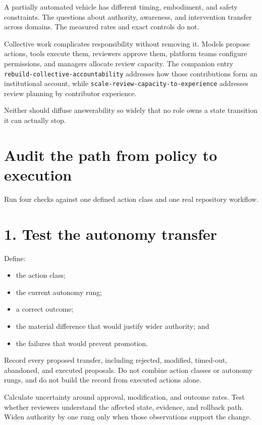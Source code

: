 A partially automated vehicle has different timing, embodiment, and safety constraints. The questions about authority, awareness, and intervention transfer across domains. The measured rates and exact controls do not.

Collective work complicates responsibility without removing it. Models propose actions, tools execute them, reviewers approve them, platform teams configure permissions, and managers allocate review capacity. The companion entry \texttt{rebuild-collective-accountability} addresses how those contributions form an institutional account, while \texttt{scale-review-capacity-to-experience} addresses review planning by contributor experience.

Neither should diffuse answerability so widely that no role owns a state transition it can actually stop.

\section{Audit the path from policy to execution}\label{audit-the-path-from-policy-to-execution}

Run four checks against one defined action class and one real repository workflow.

\section{1. Test the autonomy transfer}\label{test-the-autonomy-transfer}

Define:

\begin{itemize}
\tightlist
\item
  the action class;
\item
  the current autonomy rung;
\item
  a correct outcome;
\item
  the material difference that would justify wider authority; and
\item
  the failures that would prevent promotion.
\end{itemize}

Record every proposed transfer, including rejected, modified, timed-out, abandoned, and executed proposals. Do not combine action classes or autonomy rungs, and do not build the record from executed actions alone.

Calculate uncertainty around approval, modification, and outcome rates. Test whether reviewers understand the affected state, evidence, and rollback path. Widen authority by one rung only when those observations support the change.

